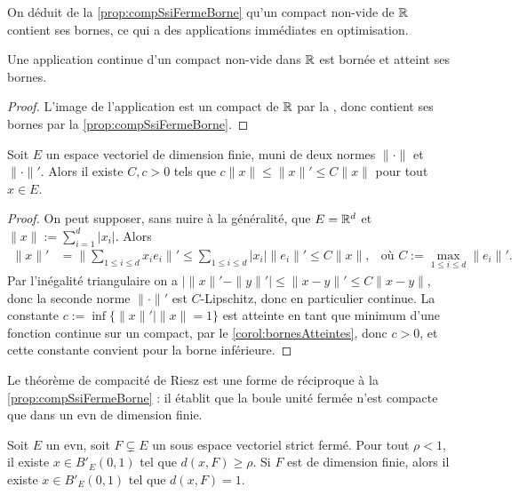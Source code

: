 On déduit de la \cref{prop:compSsiFermeBorne} qu'un compact non-vide de $\mathbb{R}$ contient ses bornes, ce qui a des applications immédiates en optimisation. 

\begin{corollary}
\label{corol:bornesAtteintes}
%
	Une application continue d'un compact non-vide dans $\mathbb{R}$ est bornée et atteint ses bornes.
\end{corollary}

\begin{proof}
	L'image de l'application est un compact de $\mathbb{R}$ par la , donc contient ses bornes par la \cref{prop:compSsiFermeBorne}.
\end{proof}

\begin{corollary}
\label{corol:normesEquivRd}
%
	Soit $E$ un espace vectoriel de dimension finie, muni de deux normes $\|\cdot\|$ et $\|\cdot\|'$.
	Alors il existe $C,c>0$ tels que $c\|x\| \leq \|x\|' \leq C \|x\|$ pour tout $x \in E$. 
\end{corollary}

\begin{proof}
	On peut supposer, sans nuire à la généralité, que $E = \mathbb{R}^d$ et $\|x\| := \sum_{i=1}^d |x_i|$. 
	Alors 
	\begin{align*}
	\|x\|' &= \Big\| \sum_{1 \leq i \leq d} x_i e_i\Big\|' \leq \sum_{1 \leq i \leq d} |x_i| \|e_i\|' \leq C \|x\|,&
	\text{où } C := \max_{1 \leq i \leq d} \|e_i\|'.	
	\end{align*}
	Par l'inégalité triangulaire on a $|  \|x\|'-\|y\|' | \leq \|x-y\|' \leq C \|x-y\|$, donc la seconde norme $\|\cdot\|'$ est $C$-Lipschitz, donc en particulier continue. La constante $c := \inf\{ \|x\|' \mid \|x\| = 1\}$ est atteinte en tant que minimum d'une fonction continue sur un compact, par le \cref{corol:bornesAtteintes}, donc $c>0$, et cette constante convient pour la borne inférieure. 
\end{proof}

Le théorème de compacité de Riesz est une forme de réciproque à la \cref{prop:compSsiFermeBorne} : il établit que la boule unité fermée n'est compacte que dans un evn de dimension finie. %
\begin{lemma}[Riesz]
\label{lem:normaleRiesz}
%
	Soit $E$ un evn, soit $F\subsetneq E$ un sous espace vectoriel strict fermé. 
	Pour tout $\rho<1$, il existe $x \in B'_E(0,1)$ tel que $d(x,F) \geq \rho$.
	Si $F$ est de dimension finie, alors il existe $x \in B'_E(0,1)$ tel que $d(x,F)=1$.  
\end{lemma}

